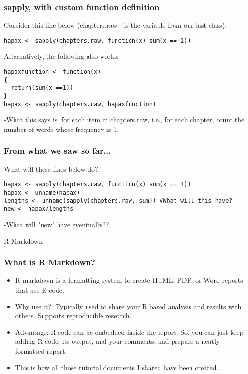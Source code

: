 \documentclass{beamer}
\begin{document}
\begin{frame}[fragile]
\frametitle{sapply, with custom function definition}
Consider this line below (chapters.raw - is the variable from our last class): \tiny
\begin{verbatim}
hapax <- sapply(chapters.raw, function(x) sum(x == 1)) 
\end{verbatim} \normalsize
Alternatively, the following also works: \tiny
\begin{verbatim}
hapaxfunction <- function(x)
{
  return(sum(x ==1))
}
hapax <- sapply(chapters.raw, hapaxfunction) 
\end{verbatim}
-What this says is: for each item in chapters.raw, i.e., for each chapter, count the number of words whose frequency is 1. 
\end{frame}

\begin{frame}[fragile]
\frametitle{From what we saw so far...}
What will these lines below do?: \tiny
\begin{verbatim}
hapax <- sapply(chapters.raw, function(x) sum(x == 1))
hapax <- unname(hapax)
lengths <- unname(sapply(chapters.raw, sum)) #What will this have?
new <- hapax/lengths
\end{verbatim} \normalsize
-What will "new" have eventually??
\end{frame}

\begin{frame}
\Large R Markdown
\end{frame}

\begin{frame}
\frametitle{What is R Markdown?}
\begin{itemize}
\item R markdown is a formatting system to create HTML, PDF, or Word reports that use R code.
\item Why use it?: Typically used to share your R based analysis and results with others. Supports reproducible research.
\item Advantage: R code can be embedded inside the report. So, you can just keep adding R code, its output, and your comments, and prepare a neatly formatted report. \pause
\item This is how all those tutorial documents I shared have been created. 
\end{itemize}
\end{frame}
\end{document}
